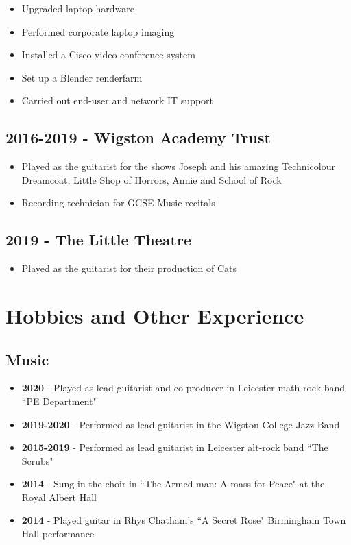 \documentclass{article}
\begin{document}
\begin{itemize}[noitemsep]

\item Upgraded laptop hardware
\item Performed corporate laptop imaging
\item Installed a Cisco video conference system 
\item Set up a Blender renderfarm
\item Carried out end-user and network IT support

\end{itemize}


\subsection{2016-2019 - Wigston Academy Trust}
\begin{itemize}[noitemsep]

\item Played as the guitarist for the shows Joseph and his amazing Technicolour Dreamcoat, Little Shop of Horrors, Annie and School of Rock
\item Recording technician for GCSE Music recitals

\end{itemize}

\subsection{2019 - The Little Theatre}
\begin{itemize}[noitemsep]

\item Played as the guitarist for their production of Cats

\end{itemize}

\section{Hobbies and Other Experience}
\subsection{Music}
\begin{itemize}[noitemsep]

\item \textbf{2020} - Played as lead guitarist and co-producer in Leicester math-rock band ``PE Department"
\item \textbf{2019-2020} - Performed as lead guitarist in the Wigston College Jazz Band
\item \textbf{2015-2019} - Performed as lead guitarist in Leicester alt-rock band ``The Scrubs"
\item \textbf{2014} - Sung in the choir in ``The Armed man: A mass for Peace" at the Royal Albert Hall
\item \textbf{2014} - Played guitar in Rhys Chatham's ``A Secret Rose" Birmingham Town Hall performance

\end{itemize}
\end{document}
